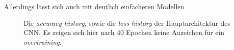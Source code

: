 Allerdings lässt sich auch mit deutlich einfacheren Modellen
\begin{figure}
  \caption{Die \textit{accuracy history}, sowie die \textit{loss history} der Hauptarchitektur des CNN. Es zeigen sich hier nach 40 Epochen keine Anzeichen für ein \textit{overtraining}.}
  \label{fig:hist}
\end{figure}
